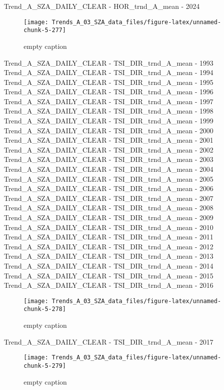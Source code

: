\documentclass[
  10pt,
  a4paper,oneside]{article}
\begin{document}
Trend\_A\_SZA\_DAILY\_CLEAR - HOR\_trnd\_A\_mean - 2024

\begin{figure}[!ht]

{\centering \texttt{[image: Trends\_A\_03\_SZA\_data\_files/figure-latex/unnamed-chunk-5-277]} 

}

\caption{ empty caption }\label{fig:unnamed-chunk-5-277}
\end{figure}

Trend\_A\_SZA\_DAILY\_CLEAR - TSI\_DIR\_trnd\_A\_mean - 1993
Trend\_A\_SZA\_DAILY\_CLEAR - TSI\_DIR\_trnd\_A\_mean - 1994
Trend\_A\_SZA\_DAILY\_CLEAR - TSI\_DIR\_trnd\_A\_mean - 1995
Trend\_A\_SZA\_DAILY\_CLEAR - TSI\_DIR\_trnd\_A\_mean - 1996
Trend\_A\_SZA\_DAILY\_CLEAR - TSI\_DIR\_trnd\_A\_mean - 1997
Trend\_A\_SZA\_DAILY\_CLEAR - TSI\_DIR\_trnd\_A\_mean - 1998
Trend\_A\_SZA\_DAILY\_CLEAR - TSI\_DIR\_trnd\_A\_mean - 1999
Trend\_A\_SZA\_DAILY\_CLEAR - TSI\_DIR\_trnd\_A\_mean - 2000
Trend\_A\_SZA\_DAILY\_CLEAR - TSI\_DIR\_trnd\_A\_mean - 2001
Trend\_A\_SZA\_DAILY\_CLEAR - TSI\_DIR\_trnd\_A\_mean - 2002
Trend\_A\_SZA\_DAILY\_CLEAR - TSI\_DIR\_trnd\_A\_mean - 2003
Trend\_A\_SZA\_DAILY\_CLEAR - TSI\_DIR\_trnd\_A\_mean - 2004
Trend\_A\_SZA\_DAILY\_CLEAR - TSI\_DIR\_trnd\_A\_mean - 2005
Trend\_A\_SZA\_DAILY\_CLEAR - TSI\_DIR\_trnd\_A\_mean - 2006
Trend\_A\_SZA\_DAILY\_CLEAR - TSI\_DIR\_trnd\_A\_mean - 2007
Trend\_A\_SZA\_DAILY\_CLEAR - TSI\_DIR\_trnd\_A\_mean - 2008
Trend\_A\_SZA\_DAILY\_CLEAR - TSI\_DIR\_trnd\_A\_mean - 2009
Trend\_A\_SZA\_DAILY\_CLEAR - TSI\_DIR\_trnd\_A\_mean - 2010
Trend\_A\_SZA\_DAILY\_CLEAR - TSI\_DIR\_trnd\_A\_mean - 2011
Trend\_A\_SZA\_DAILY\_CLEAR - TSI\_DIR\_trnd\_A\_mean - 2012
Trend\_A\_SZA\_DAILY\_CLEAR - TSI\_DIR\_trnd\_A\_mean - 2013
Trend\_A\_SZA\_DAILY\_CLEAR - TSI\_DIR\_trnd\_A\_mean - 2014
Trend\_A\_SZA\_DAILY\_CLEAR - TSI\_DIR\_trnd\_A\_mean - 2015
Trend\_A\_SZA\_DAILY\_CLEAR - TSI\_DIR\_trnd\_A\_mean - 2016

\begin{figure}[!ht]

{\centering \texttt{[image: Trends\_A\_03\_SZA\_data\_files/figure-latex/unnamed-chunk-5-278]} 

}

\caption{ empty caption }\label{fig:unnamed-chunk-5-278}
\end{figure}

Trend\_A\_SZA\_DAILY\_CLEAR - TSI\_DIR\_trnd\_A\_mean - 2017

\begin{figure}[!ht]

{\centering \texttt{[image: Trends\_A\_03\_SZA\_data\_files/figure-latex/unnamed-chunk-5-279]} 

}

\caption{ empty caption }\label{fig:unnamed-chunk-5-279}
\end{figure}
\end{document}
